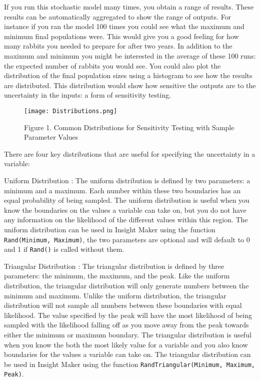 \documentclass[]{memoir}
\let\Oldincludegraphics\includegraphics
\renewcommand{\includegraphics}[1]{\Oldincludegraphics[max size={\textwidth}{\textheight}]{#1}}
\begin{document}
If you run this stochastic model many times, you obtain a range of
results. These results can be automatically aggregated to show the range
of outputs. For instance if you ran the model 100 times you could see
what the maximum and minimum final populations were. This would give you
a good feeling for how many rabbits you needed to prepare for after two
years. In addition to the maximum and minimum you might be interested in
the average of these 100 runs: the expected number of rabbits you would
see. You could also plot the distribution of the final population sizes
using a histogram to see how the results are distributed. This
distribution would show how sensitive the outputs are to the uncertainty
in the inputs: a form of sensitivity testing.

\begin{figure}[htbp]
\centering
\texttt{[image: Distributions.png]}
\caption{Figure 1. Common Distributions for Sensitivity Testing with
Sample Parameter Values}
\end{figure}

There are four key distributions that are useful for specifying the
uncertainty in a variable:

Uniform Distribution : The uniform distribution is defined by two
parameters: a minimum and a maximum. Each number within these two
boundaries has an equal probability of being sampled. The uniform
distribution is useful when you know the boundaries on the values a
variable can take on, but you do not have any information on the
likelihood of the different values within this region. The uniform
distribution can be used in Insight Maker using the function
\lstinline!Rand(Minimum, Maximum)!, the two parameters are optional and
will default to 0 and 1 if \lstinline!Rand()! is called without them.

Triangular Distribution : The triangular distribution is defined by
three parameters: the minimum, the maximum, and the peak. Like the
uniform distribution, the triangular distribution will only generate
numbers between the minimum and maximum. Unlike the uniform
distribution, the triangular distribution will not sample all numbers
between these boundaries with equal likelihood. The value specified by
the peak will have the most likelihood of being sampled with the
likelihood falling off as you move away from the peak towards either the
minimum or maximum boundary. The triangular distribution is useful when
you know the both the most likely value for a variable and you also know
boundaries for the values a variable can take on. The triangular
distribution can be used in Insight Maker using the function
\lstinline!RandTriangular(Minimum, Maximum, Peak)!.
\end{document}

